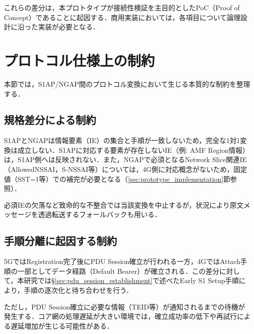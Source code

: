 これらの差分は，本プロトタイプが接続性検証を主目的としたPoC（Proof of Concept）であることに起因する．商用実装においては，各項目について論理設計に沿った実装が必要となる．

\section{プロトコル仕様上の制約}
\label{sec:protocol_constraints}
本節では，S1AP/NGAP間のプロトコル変換において生じる本質的な制約を整理する．

\subsection{規格差分による制約}
S1APとNGAPは情報要素（IE）の集合と手順が一致しないため，完全な1対1変換は成立しない．S1APに対応する要素が存在しないIE（例: AMF Region情報）は，S1AP側へは反映されない．また，NGAPで必須となるNetwork Slice関連IE（AllowedNSSAI，S-NSSAI等）については，4G側に対応概念がないため，固定値（SST=1等）での補完が必要となる（\ref{sec:prototype_implementation}節参照）．

必須IEの欠落など致命的な不整合では当該変換を中止するが，状況により原文メッセージを透過転送するフォールバックも用いる．

\subsection{手順分離に起因する制約}
5GではRegistration完了後にPDU Session確立が行われる一方，4GではAttach手順の一部としてデータ経路（Default Bearer）が確立される．この差分に対して，本研究では\S\ref{sec:pdu_session_establishment}で述べたEarly S1 Setup手順により，手順の逐次化と待ち合わせを行う．

ただし，PDU Session確立に必要な情報（TEID等）が通知されるまでの待機が発生する．コア網の処理遅延が大きい環境では，確立成功率の低下や再試行による遅延増加が生じる可能性がある．

